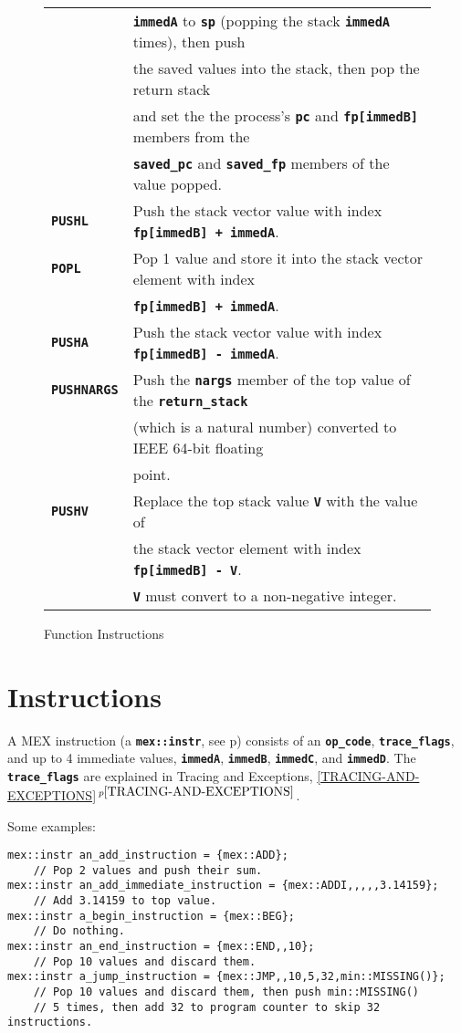\documentclass[12pt]{article}
\newcommand{\TT}[1]{{\tt \bfseries #1}}
\newcommand{\itemref}[1]{\ref{#1}$\,^{p\pageref{#1}}$}
\newcommand{\pagref}[1]{p\pageref{#1}}
\newlength{\figurewidth}
\newenvironment{boxedfigure}[1][!btp]%
	{\begin{figure*}[#1]
	 \begin{lrbox}{\figurebox}
	 \begin{minipage}{\figurewidth}

	 \vspace*{1ex}}%
	{
	 \vspace*{1ex}

	 \end{minipage}
	 \end{lrbox}

	 \centering
	 \fbox{\hspace*{0.1in}\usebox{\figurebox}\hspace*{0.1in}}
	 \end{figure*}}
\newenvironment{indpar}[1][0.3in]%
	{\begin{list}{}%
		     {\setlength{\itemsep}{0in}%
		      \setlength{\topsep}{0in}%
		      \setlength{\parsep}{1ex}%
		      \setlength{\labelwidth}{#1}%
		      \setlength{\leftmargin}{#1}%
		      \addtolength{\leftmargin}{\labelsep}}%
	 \item}%
	{\end{list}}
\begin{document}
\begin{boxedfigure}
\begin{center}
\begin{tabular}{|l|l|}
    & \TT{immedA} to \TT{sp} (popping the stack \TT{immedA} times), then push \\
    & the saved values into the stack, then pop the return stack \\
    & and set the the process's \TT{pc} and \TT{fp[immedB]} members from the \\
    & \TT{saved\_pc} and \TT{saved\_fp} members of the value popped.
\\\hline
\TT{PUSHL}
    & Push the stack vector value with index \TT{fp[immedB] + immedA}.
\\\hline
\TT{POPL}
    & Pop 1 value and store it into the stack vector element with index \\
    & \TT{fp[immedB] + immedA}.
\\\hline
\TT{PUSHA}
    & Push the stack vector value with index \TT{fp[immedB] - immedA}.
\\\hline
\TT{PUSHNARGS}
    & Push the \TT{nargs} member of the top value of the \TT{return\_stack} \\
    & (which is a natural number) converted to IEEE 64-bit floating \\
    & point.
\\\hline
\TT{PUSHV}
    & Replace the top stack value \TT{V} with the value of \\
    & the stack vector element with index \TT{fp[immedB] - V}. \\
    & \TT{V} must convert to a non-negative integer.
\\\hline
\end{tabular}
\end{center}
\caption{Function Instructions}
\label{FUNCTION-INSTRUCTIONS}
\end{boxedfigure}

\clearpage

\section{Instructions}
\label{INSTRUCTIONS}

A MEX instruction (a \TT{mex::instr}, see \pagref{MEX::INSTR})
consists of an \TT{op\_code}, \TT{trace\_flags},
and up to 4 immediate values,
\TT{immedA}, \TT{immedB}, \TT{immedC}, and \TT{immedD}.
The \TT{trace\_flags} are explained in Tracing and Exceptions,
\itemref{TRACING-AND-EXCEPTIONS}.

Some examples:
\begin{indpar}\begin{verbatim}
mex::instr an_add_instruction = {mex::ADD};
    // Pop 2 values and push their sum.
mex::instr an_add_immediate_instruction = {mex::ADDI,,,,,3.14159};
    // Add 3.14159 to top value.
mex::instr a_begin_instruction = {mex::BEG};
    // Do nothing.
mex::instr an_end_instruction = {mex::END,,10};
    // Pop 10 values and discard them.
mex::instr a_jump_instruction = {mex::JMP,,10,5,32,min::MISSING()};
    // Pop 10 values and discard them, then push min::MISSING()
    // 5 times, then add 32 to program counter to skip 32 instructions.
\end{verbatim}\end{indpar}
\end{document}
